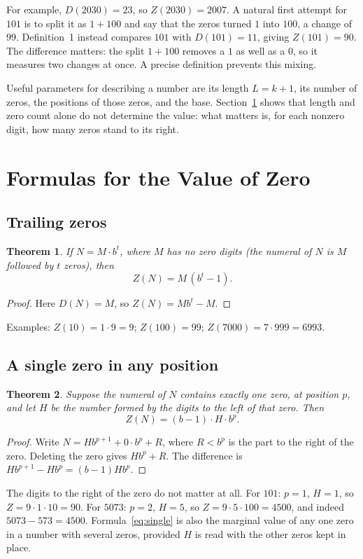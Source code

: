 \documentclass[11pt,a4paper]{article}
\newtheorem{theorem}{Theorem}
\theoremstyle{definition}
\newcommand{\Dz}{D}   %
\newcommand{\Zv}{Z}   %
\begin{document}
For example, $\Dz(2030)=23$, so $\Zv(2030)=2007$. A natural first attempt for $101$ is to split it as $1+100$ and say that the zeros turned $1$ into $100$, a change of $99$. Definition~1 instead compares $101$ with $\Dz(101)=11$, giving $\Zv(101)=90$. The difference matters: the split $1+100$ removes a $1$ as well as a $0$, so it measures two changes at once. A precise definition prevents this mixing.

Useful parameters for describing a number are its length $L=k+1$, its number of zeros, the positions of those zeros, and the base. Section~\ref{sec:formulas} shows that length and zero count alone do not determine the value: what matters is, for each nonzero digit, how many zeros stand to its right.

\section{Formulas for the Value of Zero}\label{sec:formulas}

\subsection{Trailing zeros}
\begin{theorem}\label{thm:trailing}
If $N=M\cdot b^t$, where $M$ has no zero digits (the numeral of $N$ is $M$ followed by $t$ zeros), then
\begin{equation}\label{eq:trailing}
  \Zv(N) = M\,(b^t-1).
\end{equation}
\end{theorem}
\begin{proof}
Here $\Dz(N)=M$, so $\Zv(N)=Mb^t-M$.
\end{proof}
Examples: $\Zv(10)=1\cdot 9=9$; $\Zv(100)=99$; $\Zv(7000)=7\cdot 999=6993$.

\subsection{A single zero in any position}
\begin{theorem}\label{thm:single}
Suppose the numeral of $N$ contains exactly one zero, at position $p$, and let $H$ be the number formed by the digits to the left of that zero. Then
\begin{equation}\label{eq:single}
  \Zv(N) = (b-1)\cdot H\cdot b^{p}.
\end{equation}
\end{theorem}
\begin{proof}
Write $N = H b^{p+1} + 0\cdot b^p + R$, where $R<b^p$ is the part to the right of the zero. Deleting the zero gives $H b^p + R$. The difference is $Hb^{p+1}-Hb^p=(b-1)Hb^p$.
\end{proof}
The digits to the right of the zero do not matter at all. For $101$: $p=1$, $H=1$, so $\Zv=9\cdot 1\cdot 10=90$. For $5073$: $p=2$, $H=5$, so $\Zv=9\cdot 5\cdot 100=4500$, and indeed $5073-573=4500$. Formula~\eqref{eq:single} is also the marginal value of any one zero in a number with several zeros, provided $H$ is read with the other zeros kept in place.
\end{document}
